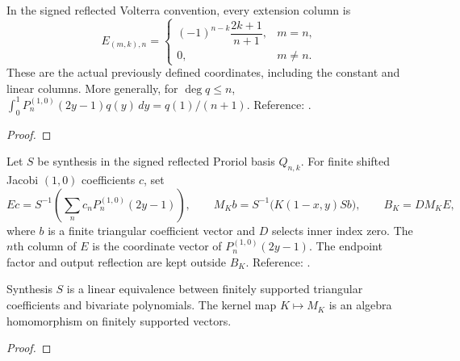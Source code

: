 \begin{theorem}
\label{thm:proriol-extension-closed-form}
\leanok
In the signed reflected Volterra convention, every extension column is
\[
 E_{(m,k),n}=\begin{cases}
 (-1)^{n-k}\dfrac{2k+1}{n+1},&m=n,\\
 0,&m\ne n.
 \end{cases}
\]
These are the actual previously defined coordinates, including the constant
and linear columns. More generally, for $\deg q\le n$,
$\int_0^1P_n^{(1,0)}(2y-1)q(y)\,dy=q(1)/(n+1)$.
Reference: \cite[Section 3.1]{gutleb-olver}.
\end{theorem}
\begin{proof}
\leanok
\end{proof}

\begin{definition}
\label{def:volterra-coefficient-assembly}
\leanok
Let $S$ be synthesis in the signed reflected Proriol basis $Q_{n,k}$.
 For finite shifted Jacobi $(1,0)$ coefficients $c$, set
\[
 Ec=S^{-1}\!\left(\sum_n c_nP_n^{(1,0)}(2y-1)\right),\qquad
 M_Kb=S^{-1}\bigl(K(1-x,y)Sb\bigr),\qquad B_K=DM_KE,
\]
where $b$ is a finite triangular coefficient vector and $D$ selects inner index zero. The $n$th column of $E$ is the coordinate vector of $P_n^{(1,0)}(2y-1)$.  The endpoint factor and output
reflection are kept outside $B_K$.
Reference: \cite[Sections 3.1--3.2]{gutleb-olver}.
\end{definition}

\begin{theorem}
\label{thm:volterra-coefficient-assembly}
\leanok
Synthesis $S$ is a linear equivalence between finitely supported triangular coefficients and bivariate polynomials. The kernel map $K\mapsto M_K$ is an algebra homomorphism on finitely supported vectors.
\end{theorem}
\begin{proof}
\leanok
\end{proof}

